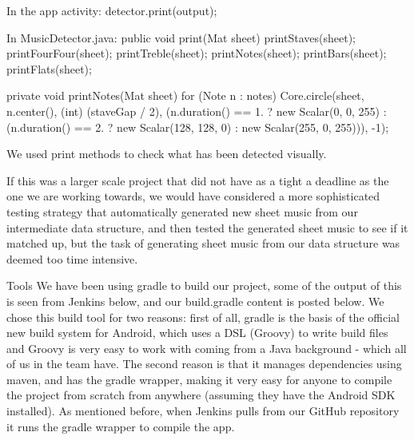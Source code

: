 In the app activity:
detector.print(output);


In MusicDetector.java:
public void print(Mat sheet) {
printStaves(sheet);
printFourFour(sheet);
printTreble(sheet);
printNotes(sheet);
printBars(sheet);
printFlats(sheet);
}


private void printNotes(Mat sheet) {
for (Note n : notes)
Core.circle(sheet, n.center(), (int) (staveGap / 2),
(n.duration() == 1. ? new Scalar(0, 0, 255)
: (n.duration() == 2. ? new Scalar(128, 128, 0)
: new Scalar(255, 0, 255))), -1);
}


We used print methods to check what has been detected visually.


If this was a larger scale project that did not have as a tight a deadline as the one we are working towards, we would have considered a more sophisticated testing strategy that automatically generated new sheet music from our intermediate data structure, and then tested the generated sheet music to see if it
matched up, but the task of generating sheet music from our data structure was deemed too time intensive.

Tools
We have been using gradle to build our project, some of the output of this is seen from Jenkins below, and our build.gradle content is posted below. We chose this build tool for two reasons: first of all, gradle is the basis of the official new build system for Android, which uses a DSL (Groovy) to write build
files and Groovy is very easy to work with coming from a Java background - which all of us in the team have. The second reason is that it manages dependencies using maven, and has the gradle wrapper, making it very easy for anyone to compile the project from scratch from anywhere (assuming they have the
Android SDK installed). As mentioned before, when Jenkins pulls from our GitHub repository it runs the gradle wrapper to compile the app. 

